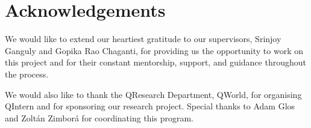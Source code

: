 \chapter*{Acknowledgements}

We would like to extend our heartiest gratitude to our supervisors, Srinjoy Ganguly and Gopika Rao Chaganti, for providing us the opportunity to work on this project and for their constant mentorship, support, and guidance throughout the process.

We would also like to thank the QResearch Department, QWorld, for organising QIntern and for sponsoring our research project. Special thanks to Adam Glos and ‪Zoltán Zimborá for coordinating this program.